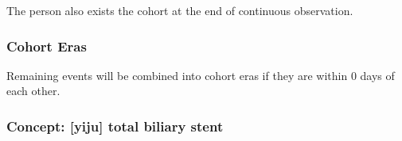 \documentclass[
  12pt,
]{article}
\begin{document}
The person also exists the cohort at the end of continuous observation.

\subsubsection{Cohort Eras}\label{cohort-eras-6}

Remaining events will be combined into cohort eras if they are within 0 days of each other.

\subsubsection{Concept: {[}yiju{]} total biliary stent}\label{concept-yiju-total-biliary-stent}

\begingroup\fontsize{8}{10}\selectfont
\end{document}
